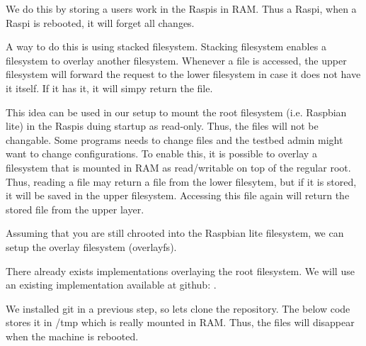We do this by storing a users work in the \ac{Raspi}s in \ac{RAM}. Thus a
\ac{Raspi}, when a \ac{Raspi} is rebooted, it will forget all changes.

A way to do this is using stacked filesystem. Stacking filesystem enables
a filesystem to overlay another filesystem. Whenever a file is accessed,
the upper filesystem will forward the request to the lower filesystem in
case it does not have it itself. If it has it, it will simpy return the file.

This idea can be used in our setup to mount the root filesystem (i.e. Raspbian
lite) in the \ac{Raspi}s duing startup as read-only. Thus, the files will not
be changable. Some programs needs to change files and the testbed admin might
want to change configurations. To enable this, it is possible to
overlay a filesystem that is mounted in \ac{RAM} as read/writable on top of
the regular root. Thus, reading a file may return a file from the lower filesytem,
but if it is stored, it will be saved in the upper filesystem. Accessing this file
again will return the stored file from the upper layer.



%
%
%
%

Assuming that you are still chrooted into the Raspbian lite filesystem, we
can setup the overlay filesystem (overlayfs).

There already exists implementations overlaying the root filesystem. We will
use an existing implementation
available at github: \cite{overlayroot}.

We installed git in a previous step, so lets clone the repository. The below
code stores it in /tmp which is really mounted in \ac{RAM}. Thus, the files
will disappear when the machine is rebooted.

